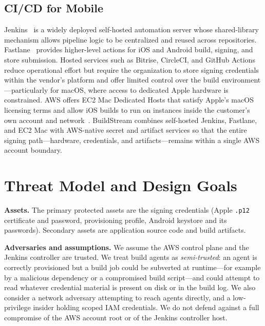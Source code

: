 \documentclass[conference]{IEEEtran}
\begin{document}
\subsection{CI/CD for Mobile}
Jenkins~\cite{jenkins} is a widely deployed self-hosted automation server whose
shared-library mechanism allows pipeline logic to be centralized and reused
across repositories. Fastlane~\cite{fastlane} provides higher-level actions for
iOS and Android build, signing, and store submission. Hosted services such as
Bitrise, CircleCI, and GitHub Actions~\cite{ghactions} reduce operational effort
but require the organization to store signing credentials within the vendor's
platform and offer limited control over the build environment---particularly for
macOS, where access to dedicated Apple hardware is constrained. AWS offers EC2
Mac Dedicated Hosts that satisfy Apple's macOS licensing terms and allow iOS
builds to run on instances inside the customer's own account and
network~\cite{ec2mac}. BuildStream combines self-hosted Jenkins, Fastlane, and
EC2 Mac with AWS-native secret and artifact services so that the entire signing
path---hardware, credentials, and artifacts---remains within a single AWS
account boundary.

\section{Threat Model and Design Goals}\label{sec:threat}
\textbf{Assets.} The primary protected assets are the signing credentials
(Apple \texttt{.p12} certificate and password, provisioning profile, Android
keystore and its passwords). Secondary assets are application source code and
build artifacts.

\textbf{Adversaries and assumptions.} We assume the AWS control plane and the
Jenkins controller are trusted. We treat build agents as \emph{semi-trusted}:
an agent is correctly provisioned but a build job could be subverted at
runtime---for example by a malicious dependency or a compromised build
script---and could attempt to read whatever credential material is present on
disk or in the build log. We also consider a network adversary attempting to
reach agents directly, and a low-privilege insider holding scoped IAM
credentials. We do not defend against a full compromise of the AWS account root
or of the Jenkins controller host.
\end{document}
